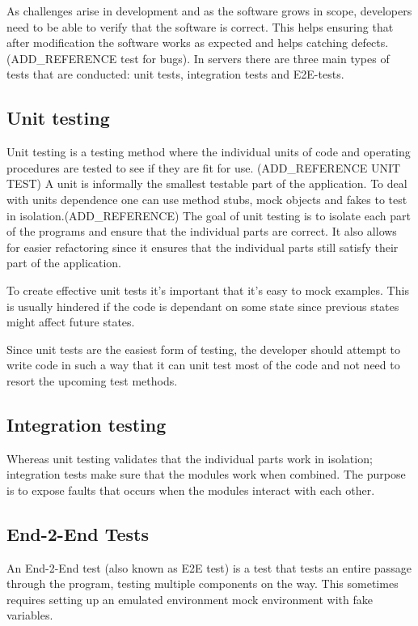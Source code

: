 As challenges arise in development and as the software grows in scope,
developers need to be able to verify that the software is correct. This helps
ensuring that after modification the software works as expected and helps
catching defects.(ADD\_REFERENCE test for bugs). In servers there are three main
types of tests that are conducted: unit tests, integration tests and E2E-tests.

\subsection{Unit testing}

Unit testing is a testing method where the individual units of code and
operating procedures are tested to see if they are fit for use. (ADD\_REFERENCE
UNIT TEST) A unit is informally the smallest testable part of the application.
To deal with units dependence one can use method stubs, mock objects and fakes
to test in isolation.(ADD\_REFERENCE) The goal of unit testing is to isolate
each part of the programs and ensure that the individual parts are correct. It
also allows for easier refactoring since it ensures that the individual parts
still satisfy their part of the application.

To create effective unit tests it's important that it's easy to mock examples.
This is usually hindered if the code is dependant on some state since previous
states might affect future states.

Since unit tests are the easiest form of testing, the developer should attempt
to write code in such a way that it can unit test most of the code and not need
to resort the upcoming test methods.

\subsection{Integration testing}

Whereas unit testing validates that the individual parts work in isolation;
integration tests make sure that the modules work when combined. The purpose is
to expose faults that occurs when the modules interact with each other.

\subsection{End-2-End Tests}

An End-2-End test (also known as E2E test) is a test that tests an entire
passage through the program, testing multiple components on the way. This
sometimes requires setting up an emulated environment mock environment with fake
variables.

